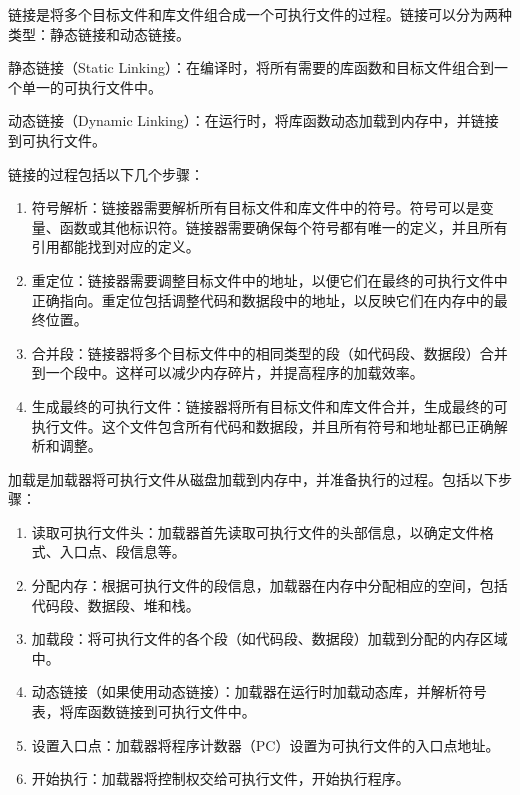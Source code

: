 \documentclass[UTF8]{article}
\begin{document}
链接是将多个目标文件和库文件组合成一个可执行文件的过程。链接可以分为两种类型：静态链接和动态链接。

静态链接（Static Linking）：在编译时，将所有需要的库函数和目标文件组合到一个单一的可执行文件中。

动态链接（Dynamic Linking）：在运行时，将库函数动态加载到内存中，并链接到可执行文件。

链接的过程包括以下几个步骤：

\begin{enumerate}
  \item 符号解析：链接器需要解析所有目标文件和库文件中的符号。符号可以是变量、函数或其他标识符。链接器需要确保每个符号都有唯一的定义，并且所有引用都能找到对应的定义。
  \item 重定位：链接器需要调整目标文件中的地址，以便它们在最终的可执行文件中正确指向。重定位包括调整代码和数据段中的地址，以反映它们在内存中的最终位置。
  \item 合并段：链接器将多个目标文件中的相同类型的段（如代码段、数据段）合并到一个段中。这样可以减少内存碎片，并提高程序的加载效率。
  \item 生成最终的可执行文件：链接器将所有目标文件和库文件合并，生成最终的可执行文件。这个文件包含所有代码和数据段，并且所有符号和地址都已正确解析和调整。
\end{enumerate}

加载是加载器将可执行文件从磁盘加载到内存中，并准备执行的过程。包括以下步骤：

\begin{enumerate}
  \item 读取可执行文件头：加载器首先读取可执行文件的头部信息，以确定文件格式、入口点、段信息等。
  \item 分配内存：根据可执行文件的段信息，加载器在内存中分配相应的空间，包括代码段、数据段、堆和栈。
  \item 加载段：将可执行文件的各个段（如代码段、数据段）加载到分配的内存区域中。
  \item 动态链接（如果使用动态链接）：加载器在运行时加载动态库，并解析符号表，将库函数链接到可执行文件中。
  \item 设置入口点：加载器将程序计数器（PC）设置为可执行文件的入口点地址。
  \item 开始执行：加载器将控制权交给可执行文件，开始执行程序。
\end{enumerate}
\end{document}
